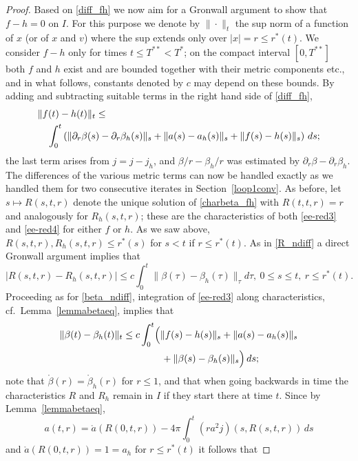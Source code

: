 \documentclass[11pt]{article}
\begin{document}
\begin{proof}
  Based on \eqref{diff_fh} we now aim for a Gronwall argument to show that
  $f-h=0$ on $I$. For this purpose we denote by $\|\cdot\|_t$ the sup norm
  of a function of $x$ (or of $x$ and $v$) where the sup extends only
  over $|x|=r \leq r^\ast(t)$. We consider $f-h$ only for times
  $t\leq T^{\ast\ast}<T^\ast$; on the compact interval $[0,T^{\ast\ast}]$
  both $f$ and $h$ exist and are bounded together with their metric
  components etc., and in what follows, constants denoted by
  $c$ may depend on these bounds. By adding and subtracting suitable
  terms in the right hand side of \eqref{diff_fh},
  \begin{align}\label{fh_diff}
    &\|f(t)-h(t)\|_t \leq \notag \\
    &\quad
    \int_0^t\left(\|\partial_r \beta(s)-\partial_r\beta_h(s)\|_s
    + \|a(s)-a_h(s)\|_s + \|f(s)-h(s)\|_s\right)\, ds;
  \end{align}
  the last term arises from $j=j-j_h$, and $\beta/r-\beta_h/r$ 
  was estimated by $\partial_r\beta - \partial_r\beta_h$.
  The differences of the various
  metric terms can now be handled exactly as we handled them for two
  consecutive iterates in Section~\ref{loop1conv}.
  As before, let $s\mapsto R(s,t,r)$ denote the unique solution
  of \eqref{charbeta_fh}
  with $R(t,t,r)=r$ and analogously for $R_h(s,t,r)$;
  these are the characteristics of both
  \eqref{ee-red3} and \eqref{ee-red4} for either $f$ or $h$.
  As we saw above, $R(s,t,r), R_h(s,t,r) \leq r^\ast(s)$ for $s<t$
  if $r\leq r^\ast(t)$.
  As in \eqref{R_ndiff} a direct Gronwall argument implies that
  \[
  |R(s,t,r) - R_h(s,t,r)|
  \leq c \int_0^t
  \|\beta (\tau)-\beta_h (\tau)\|_\tau d\tau,\ 0\leq s\leq t,\ r\leq r^\ast(t).
  \]
  Proceeding as for \eqref{beta_ndiff}, integration
  of \eqref{ee-red3} along characteristics, cf.~Lemma~\ref{lemmabetaeq},
  implies that
  \begin{align*}
    \|\beta(t)-\beta_h(t)\|_t
    &\leq
    c \int_0^t\Bigl(\|f(s)-h(s)\|_s + \|a(s)-a_h(s)\|_s \notag\\
    &\qquad\qquad {}+ \|\beta(s)-\beta_h(s)\|_s\Bigr)\, ds;
  \end{align*}
  note that $\mathring{\beta}(r) = \mathring{\beta}_h(r)$ for
  $r\leq 1$, and that when going backwards in time
  the characteristics $R$ and $R_h$ remain in $I$ if they
  start there at time $t$.
  Since by Lemma~\ref{lemmabetaeq},
  \[
  a(t,r)=\mathring{a}(R(0,t,r))
  - 4\pi \int_0^t \left(r a^2 j\right)(s,R(s,t,r))\, ds
  \]
  and $\mathring{a}(R(0,t,r))=1=a_h$ for $r\leq r^\ast(t)$ it follows that

\end{proof}
\end{document}
